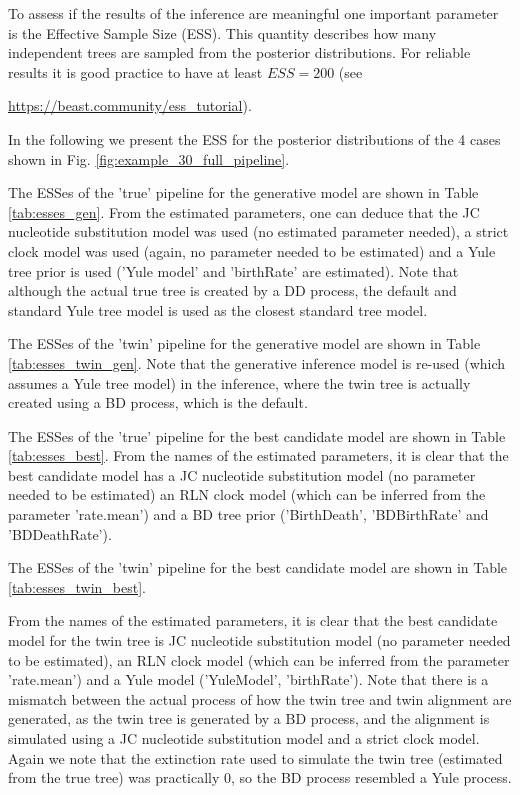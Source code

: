 To assess if the results of the inference are meaningful one important 
parameter is the Effective Sample Size (ESS). This quantity describes how 
many independent trees are sampled from the posterior distributions. 
For reliable results it is good practice to have at 
least $ESS = 200$ (see 
\begin{sloppypar}
  \url{https://beast.community/ess_tutorial}).
\end{sloppypar}
In the following we present the ESS for the posterior distributions of 
the 4 cases shown in Fig. \ref{fig:example_30_full_pipeline}.

The ESSes of the 'true' pipeline for the generative model
are shown in Table \ref{tab:esses_gen}.
From the estimated parameters, one can deduce that
the JC nucleotide substitution model was used (no
estimated parameter needed), a strict clock model was 
used (again, no parameter needed to be estimated)
and a Yule tree prior is used ('Yule model' and 'birthRate' are estimated).
Note that although the actual true tree is created by a DD process, 
the default and standard Yule tree model is used as the closest
standard tree model.



\newpage

The ESSes of the 'twin' pipeline for the generative model
are shown in Table \ref{tab:esses_twin_gen}.
Note that the generative inference model is re-used (which assumes a Yule tree model) in the inference, 
where the twin tree is actually created using a BD process,
which is the default.



\newpage

The ESSes of the 'true' pipeline for the best candidate model
are shown in Table \ref{tab:esses_best}. 
From the names of the estimated parameters, it is clear that
the best candidate model has a JC nucleotide substitution 
model (no parameter needed to be estimated)
an RLN clock model (which can be inferred from the parameter 'rate.mean') 
and a BD tree prior ('BirthDeath', 'BDBirthRate' and 'BDDeathRate').



\newpage

The ESSes of the 'twin' pipeline for the best candidate model
are shown in Table \ref{tab:esses_twin_best}.

From the names of the estimated parameters, it is clear that
the best candidate model for the twin tree
is JC nucleotide substitution 
model (no parameter needed to be estimated),
an RLN clock model (which can be inferred from the parameter 'rate.mean') 
and a Yule model ('YuleModel', 'birthRate').
Note that there is a mismatch between the actual process of how the twin tree
and twin alignment are generated, as the twin tree is generated by a
BD process, and the alignment is simulated using a JC nucleotide
substitution model and a strict clock model. Again we note that the extinction rate used to simulate the twin tree (estimated from the true tree) was practically 0, so the BD process resembled a Yule process.

